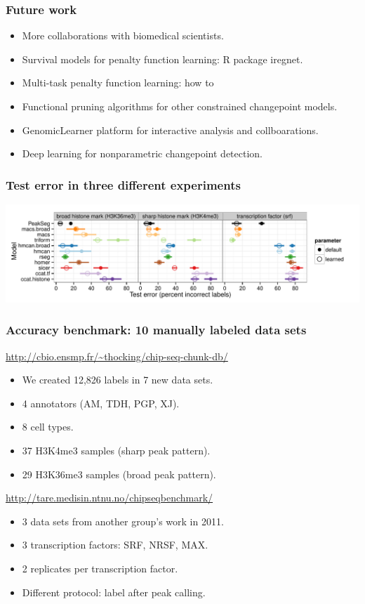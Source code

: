 \documentclass{beamer}
\begin{document}
\appendix

\begin{frame}
  \frametitle{Future work}
  \begin{itemize}
  \item More collaborations with biomedical scientists.
  \item Survival models for penalty function learning: R package
    iregnet.
  \item Multi-task penalty function learning: how to 
  \item Functional pruning algorithms for other constrained
    changepoint models.
  \item GenomicLearner platform for interactive analysis and
    collboarations.
  \item Deep learning for nonparametric changepoint detection.
  \end{itemize}
\end{frame}

\begin{frame}
  \frametitle{Test error in three different experiments}
  \includegraphics[width=1.1\textwidth]{figure-test-error-dots-mean.pdf}
\end{frame}

\begin{frame}
  \frametitle{Accuracy benchmark: 10 manually labeled data sets}
  \url{http://cbio.ensmp.fr/~thocking/chip-seq-chunk-db/}
  \begin{itemize}
  \item We created 12,826 labels in 7 new data sets.
  \item 4 annotators (AM, TDH, PGP, XJ).
  \item 8 cell types.
  \item 37 H3K4me3 samples (sharp peak pattern).
  \item 29 H3K36me3 samples (broad peak pattern).
  \end{itemize}
  \vskip 1cm
  \url{http://tare.medisin.ntnu.no/chipseqbenchmark/}
  \begin{itemize}
  \item 3 data sets from another group's work in 2011.
  \item 3 transcription factors: SRF, NRSF, MAX.
  \item 2 replicates per transcription factor.
  \item Different protocol: label after peak calling.
  \end{itemize}
\end{frame}
\end{document}
